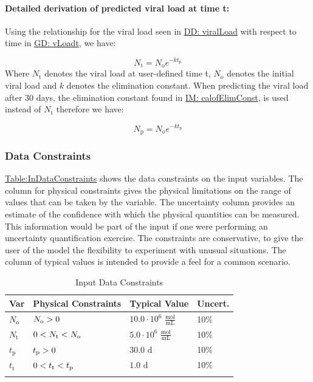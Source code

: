 \documentclass[12pt]{article}
\newcommand{\gt}{\ensuremath >}
\newcommand{\lt}{\ensuremath <}
\begin{document}
\paragraph{Detailed derivation of predicted viral load at time t:}
\label{IM:calofPredictedVLDeriv}
Using the relationship for the viral load seen in \hyperref[DD:viralLoad]{DD: viralLoad} with respect to time in \hyperref[GD:vLoadt]{GD: vLoadt}, we have:

\begin{displaymath}
{N_{\text{t}}}={N_{\text{o}}} e^{-k {t_{\text{p}}}}
\end{displaymath}
Where ${N_{\text{t}}}$ denotes the viral load at user-defined time t, ${N_{\text{o}}}$ denotes the initial viral load and $k$ denotes the elimination constant. When predicting the viral load after 30 days, the elimination constant  found in \hyperref[IM:calofElimConst]{IM: calofElimConst},  is used instead of ${N_{\text{t}}}$  therefore we have:

\begin{displaymath}
{N_{\text{p}}}={N_{\text{o}}} e^{-k {t_{\text{p}}}}
\end{displaymath}
\subsubsection{Data Constraints}
\label{Sec:DataConstraints}
\hyperref[Table:InDataConstraints]{Table:InDataConstraints} shows the data constraints on the input variables. The column for physical constraints gives the physical limitations on the range of values that can be taken by the variable. The uncertainty column provides an estimate of the confidence with which the physical quantities can be measured. This information would be part of the input if one were performing an uncertainty quantification exercise. The constraints are conservative, to give the user of the model the flexibility to experiment with unusual situations. The column of typical values is intended to provide a feel for a common scenario.

\begin{longtable}{l l l l}
\toprule
\textbf{Var} & \textbf{Physical Constraints} & \textbf{Typical Value} & \textbf{Uncert.}
\\
\midrule
\endhead
${N_{\text{o}}}$ & ${N_{\text{o}}}\gt{}0$ & $10.0\cdot{}10^{6}$ $\frac{\text{mol}}{\text{mL}}$ & 10$\%$
\\
${N_{\text{t}}}$ & $0\lt{}{N_{\text{t}}}\lt{}{N_{\text{o}}}$ & $5.0\cdot{}10^{6}$ $\frac{\text{mol}}{\text{mL}}$ & 10$\%$
\\
${t_{\text{p}}}$ & ${t_{\text{p}}}\gt{}0$ & $30.0$ ${\text{d}}$ & 10$\%$
\\
${t_{\text{t}}}$ & $0\lt{}{t_{\text{t}}}\lt{}{t_{\text{p}}}$ & $1.0$ ${\text{d}}$ & 10$\%$
\\
\bottomrule
\caption{Input Data Constraints}
\label{Table:InDataConstraints}
\end{longtable}
\end{document}
